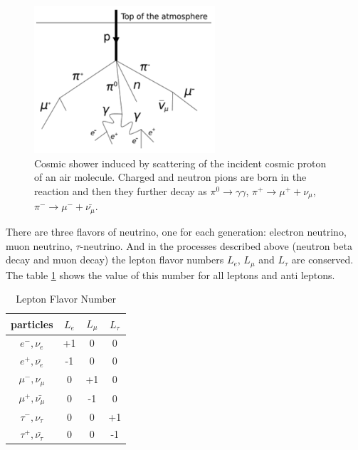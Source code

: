 \begin{figure}
\caption{Cosmic shower induced by scattering of the incident cosmic proton of an air molecule. Charged and neutron pions are born in the reaction and then they further decay as $\pi^0 \rightarrow \gamma\gamma$, $\pi^+ \rightarrow \mu^+ + \nu_\mu$, $\pi^- \rightarrow \mu^- + \bar{\nu_\mu}$.}
\label{fig:cosmicMuons}
\centering
\includegraphics[width=0.60\textwidth, keepaspectratio=true]{figs/cosmicMuons.png}
\end{figure}



There are three flavors of neutrino, one for each generation: electron neutrino, muon neutrino, $\tau$-neutrino. And in the processes described above (neutron beta decay and muon decay) the lepton flavor numbers $L_e$, $L_{\mu}$ and $L_{\tau}$ are conserved. The table \ref{tab:LeptonFlavorNumber} shows the value of this number for all leptons and anti leptons. 

\begin{table}[h]
  \begin{center}
  \caption{ Lepton Flavor Number}
  \begin{tabular}{|c|c|c|c|}
     particles & $L_e$ & $L_{\mu}$ & $L_{\tau}$ \\ \hline
     $e^-,\nu_e$ &  +1  &  0  &  0  \\ \hline 
     $e^+, \bar{\nu_e}$ &  -1  &  0  &  0  \\ \hline 
     $\mu^-,\nu_{\mu}$ &  0  &  +1  &  0  \\ \hline 
     $\mu^+, \bar{\nu_{\mu}}$ &  0  &  -1  &  0  \\ \hline 
     $\tau^-,\nu_{\tau}$ &  0  &  0  &  +1  \\ \hline 
     $\tau^+, \bar{\nu_{\tau}}$ &  0  &  0  &  -1  \\ \hline 
  \end{tabular}
  \label{tab:LeptonFlavorNumber}
  \end{center}
\end{table}


